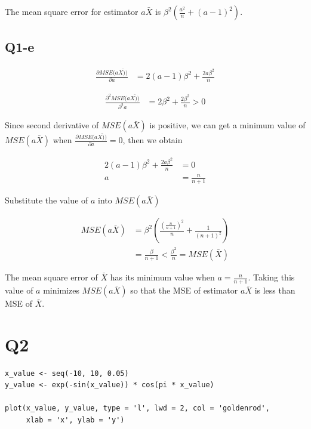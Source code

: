 \documentclass[12pt,letterpaper]{article}
\begin{document}
\noindent The mean square error for estimator $a \bar{X}$ is $\beta^2 (\frac{a^2}{n} + (a-1)^2)$.

\subsection*{Q1-e}

\begin{align*}
\frac{\partial MSE(a \bar{X))}}{{\partial a}} &= 2(a-1) \beta^2 + \frac{2a  \beta^2}{n}
\end{align*}

\begin{align*}
\frac{\partial^2 MSE(a \bar{X))}}{{\partial^2 a}} &= 2 \beta^2 + \frac{2 \beta^2}{n} > 0
\end{align*}

\noindent Since second derivative of $MSE(a \bar{X})$ is positive, we can get a minimum value of $MSE(a \bar{X})$ when $\frac{\partial MSE(a \bar{X))}}{{\partial a}} = 0$, then we obtain

\begin{align*}
2(a-1) \beta^2 + \frac{2a  \beta^2}{n} &= 0 \\
a &= \frac{n}{n+1}
\end{align*}

\noindent Substitute the value of $a$ into $MSE(a \bar{X})$

\begin{align*}
MSE(a \bar{X}) &= \beta^2 (\frac{(\frac{n}{n+1})^2}{n} + \frac{1}{(n+1)^2}) \\
&= \frac{\beta}{n+1} < \frac{\beta^2}{n} = MSE(\bar{X})
\end{align*}

\noindent The mean square error of $\bar{X}$ has its minimum value when $a = \frac{n}{n+1}$. Taking this value of $a$ minimizes $MSE(a \bar{X})$ so that the MSE of estimator $a \bar{X}$ is less than MSE of $\bar{X}$.

\newpage

\section*{Q2}

\begin{verbatim}
x_value <- seq(-10, 10, 0.05)
y_value <- exp(-sin(x_value)) * cos(pi * x_value)

plot(x_value, y_value, type = 'l', lwd = 2, col = 'goldenrod',
     xlab = 'x', ylab = 'y')
\end{verbatim}
\end{document}
